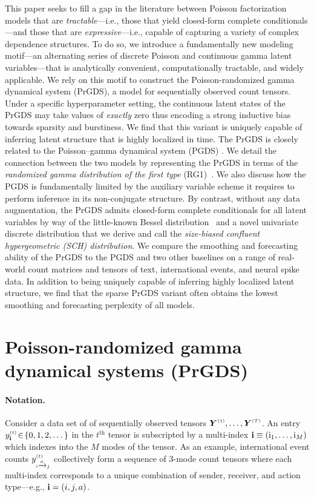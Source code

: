 \documentclass{article}
\begin{document}
This paper seeks to fill a gap in the literature between Poisson factorization models that are \emph{tractable}---i.e., those that yield closed-form complete conditionals---and those that are \emph{expressive}---i.e., capable of capturing a variety of complex dependence structures. To do so, we introduce a fundamentally new modeling motif---an alternating series of discrete Poisson and continuous gamma latent variables---that is analytically convenient, computationally tractable, and widely applicable. We rely on this motif to construct the Poisson-randomized gamma dynamical system (PrGDS), a model for sequentially observed count tensors. Under a specific hyperparameter setting, the continuous latent states of the PrGDS may take values of \emph{exactly} zero thus encoding a strong inductive bias towards sparsity and burstiness. We find that this variant is uniquely capable of inferring latent structure that is highly localized in time. The PrGDS is closely related to the Poisson--gamma dynamical system (PGDS) \cite{schein2016poisson}. We detail the connection between the two models by representing the PrGDS in terms of the \emph{randomized gamma distribution of the first type} (RG1)~\cite{yuan2000bessel,makarov2010exact}. We also discuss how the PGDS is fundamentally limited by the auxiliary variable scheme it requires to perform inference in its non-conjugate structure. By contrast, without any data augmentation, the PrGDS admits closed-form complete conditionals for all latent variables by way of the little-known Bessel distribution~\cite{yuan2000bessel} and a novel univariate discrete distribution that we derive and call the \emph{size-biased confluent hypergeometric (SCH) distribution}. We compare the smoothing and forecasting ability of the PrGDS to the PGDS and two other baselines on a range of real-world count matrices and tensors of text, international events, and neural spike data. In addition to being uniquely capable of inferring highly localized latent structure, we find that the sparse PrGDS variant often obtains the lowest smoothing and forecasting perplexity of all models.~

\section{Poisson-randomized gamma dynamical systems (PrGDS)}
\label{sec:prgds}

\paragraph{Notation.}Consider a data set of of sequentially observed tensors $\boldsymbol{Y}^{\mathsmaller{(1)}},\dots,\boldsymbol{Y}^{\mathsmaller{(T)}}$. An entry $\ydt \!\in\! \{0,1,2,\dots\}$ in the $t^{\textrm{th}}$ tensor is subscripted by a multi-index $\textbf{\textrm{i}} \equiv (\textrm{i}_1,\dots,\textrm{i}_M)$ which indexes into the $M$ modes of the tensor. As an example, international event counts $y^{\mathsmaller{(t)}}_{\mathsmaller{i \xrightarrow{a} j}}$ collectively form a sequence of 3-mode count tensors where each multi-index corresponds to a unique combination of sender, receiver, and action type---e.g., $\textbf{\textrm{i}} = (i, j, a)$.
\end{document}
